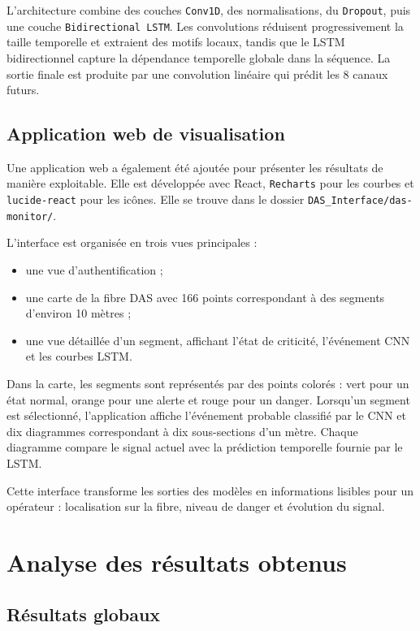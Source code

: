\documentclass[10pt,a4paper]{article}
\begin{document}
L'architecture combine des couches \texttt{Conv1D}, des normalisations, du \texttt{Dropout}, puis une couche
\texttt{Bidirectional LSTM}. Les convolutions réduisent progressivement la taille temporelle et extraient des
motifs locaux, tandis que le LSTM bidirectionnel capture la dépendance temporelle globale dans la séquence.
La sortie finale est produite par une convolution linéaire qui prédit les 8 canaux futurs.

\subsection{Application web de visualisation}

Une application web a également été ajoutée pour présenter les résultats de manière exploitable. Elle est
développée avec React, \texttt{Recharts} pour les courbes et \texttt{lucide-react} pour les icônes. Elle se
trouve dans le dossier \texttt{DAS\_Interface/das-monitor/}.

L'interface est organisée en trois vues principales :

\begin{itemize}
    \item une vue d'authentification ;
    \item une carte de la fibre DAS avec 166 points correspondant à des segments d'environ 10 mètres ;
    \item une vue détaillée d'un segment, affichant l'état de criticité, l'événement CNN et les courbes LSTM.
\end{itemize}

Dans la carte, les segments sont représentés par des points colorés : vert pour un état normal, orange pour
une alerte et rouge pour un danger. Lorsqu'un segment est sélectionné, l'application affiche l'événement
probable classifié par le CNN et dix diagrammes correspondant à dix sous-sections d'un mètre. Chaque diagramme
compare le signal actuel avec la prédiction temporelle fournie par le LSTM.

Cette interface transforme les sorties des modèles en informations lisibles pour un opérateur : localisation
sur la fibre, niveau de danger et évolution du signal.

\section{Analyse des résultats obtenus}

\subsection{Résultats globaux}
\end{document}
